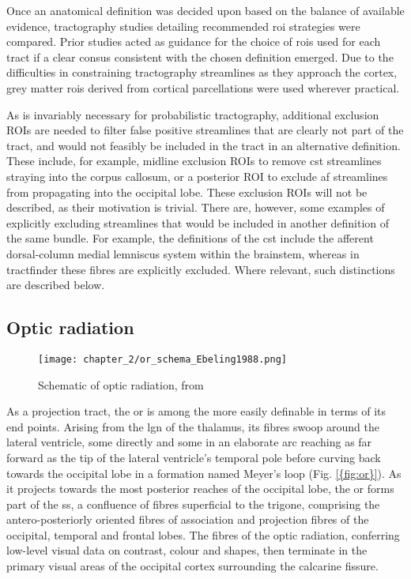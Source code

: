 Once an anatomical definition was decided upon based on the balance of available evidence, tractography studies detailing recommended \gls{roi} strategies were compared.
Prior studies acted as guidance for the choice of \glspl{roi} used for each tract if a clear consus consistent with the chosen definition emerged.
Due to the difficulties in constraining tractography streamlines as they approach the cortex, grey matter \glspl{roi} derived from cortical parcellations were used wherever practical.

As is invariably necessary for probabilistic tractography, additional exclusion ROIs are needed to filter false positive streamlines that are clearly not part of the tract, and would not feasibly be included in the tract in an alternative definition.
These include, for example, midline exclusion ROIs to remove \gls{cst} streamlines straying into the corpus callosum, or a posterior ROI to exclude \gls{af} streamlines from propagating into the occipital lobe.
These exclusion ROIs will not be described, as their motivation is trivial.
There are, however, some examples of explicitly excluding streamlines that would be included in another definition of the same bundle.
For example, the definitions of the \gls{cst} include the afferent dorsal-column medial lemniscus system within the brainstem, whereas in tractfinder these fibres are explicitly excluded.
Where relevant, such distinctions are described below.

\subsection{Optic radiation}

\begin{SCfigure}[][htb!]
  \texttt{[image: chapter\_2/or\_schema\_Ebeling1988.png]}
  \caption{ Schematic of optic radiation, from \textcite{Ebeling1988}}
  \label{fig:or}
\end{SCfigure}

As a projection tract, the \gls{or} is among the more easily definable in terms of its end points.
Arising from the \gls{lgn} of the thalamus, its fibres swoop around the lateral ventricle, some directly and some in an elaborate arc reaching as far forward as the tip of the lateral ventricle's temporal pole before curving back towards the occipital lobe in a formation named Meyer's loop (Fig. \ref{{fig:or}}).\autocite{Sarubbo2015}
As it projects towards the most posterior reaches of the occipital lobe, the \gls{or} forms part of the \gls{ss}, a confluence of fibres superficial to the \gls{trigone}, comprising the antero-posteriorly oriented fibres of association and projection fibres of the occipital, temporal and frontal lobes.\autocite{Maldonado2021}
The fibres of the optic radiation, conferring low-level visual data on contrast, colour and shapes, then terminate in the primary visual areas of the occipital cortex surrounding the calcarine fissure.

